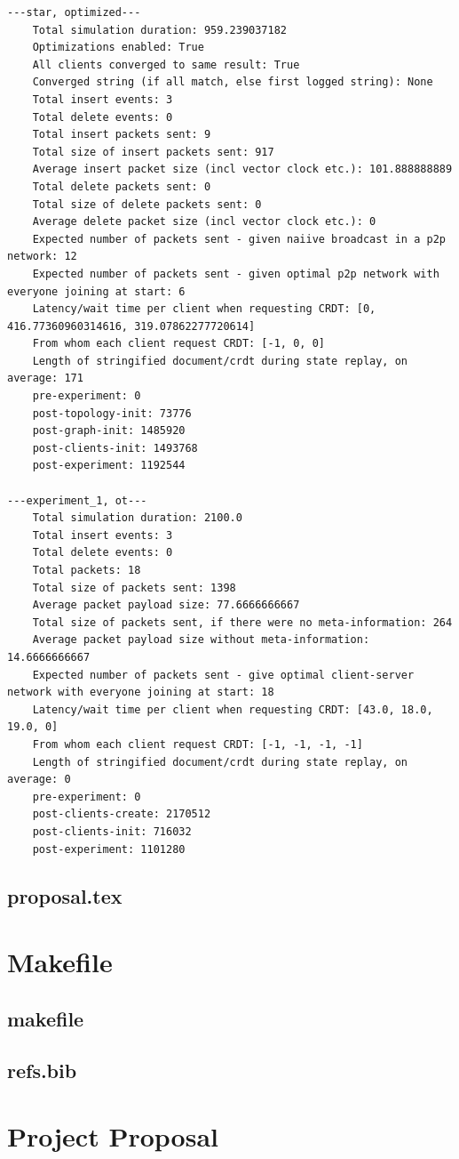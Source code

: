 \documentclass[12pt,a4paper,twoside,openright]{report}
\begin{document}
\begin{verbatim}
---star, optimized---
	Total simulation duration: 959.239037182
	Optimizations enabled: True
	All clients converged to same result: True
	Converged string (if all match, else first logged string): None
	Total insert events: 3
	Total delete events: 0
	Total insert packets sent: 9
	Total size of insert packets sent: 917
	Average insert packet size (incl vector clock etc.): 101.888888889
	Total delete packets sent: 0
	Total size of delete packets sent: 0
	Average delete packet size (incl vector clock etc.): 0
	Expected number of packets sent - given naiive broadcast in a p2p network: 12
	Expected number of packets sent - given optimal p2p network with everyone joining at start: 6
	Latency/wait time per client when requesting CRDT: [0, 416.77360960314616, 319.07862277720614]
	From whom each client request CRDT: [-1, 0, 0]
	Length of stringified document/crdt during state replay, on average: 171
	pre-experiment: 0
	post-topology-init: 73776
	post-graph-init: 1485920
	post-clients-init: 1493768
	post-experiment: 1192544

---experiment_1, ot---
	Total simulation duration: 2100.0
	Total insert events: 3
	Total delete events: 0
	Total packets: 18
	Total size of packets sent: 1398
	Average packet payload size: 77.6666666667
	Total size of packets sent, if there were no meta-information: 264
	Average packet payload size without meta-information: 14.6666666667
	Expected number of packets sent - give optimal client-server network with everyone joining at start: 18
	Latency/wait time per client when requesting CRDT: [43.0, 18.0, 19.0, 0]
	From whom each client request CRDT: [-1, -1, -1, -1]
	Length of stringified document/crdt during state replay, on average: 0
	pre-experiment: 0
	post-clients-create: 2170512
	post-clients-init: 716032
	post-experiment: 1101280

\end{verbatim}

\section{proposal.tex}
{\scriptsize}

\chapter{Makefile}

\section{makefile}\label{makefile}
{\scriptsize}

\section{refs.bib}
{\scriptsize}


\chapter{Project Proposal}


\end{document}
